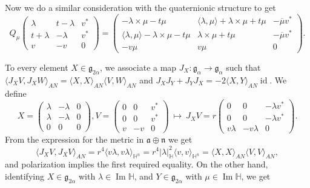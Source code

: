 \documentclass[12pt, a4paper]{amsart}
\newcommand{\id}{\operatorname{id}}
\newcommand{\g}{\mathfrak}
\renewcommand{\H}{\mathbb{H}}
\renewcommand{\Im}{\operatorname{Im}}
\theoremstyle{remark}
\begin{document}
Now we do a similar consideration with the quaternionic structure to get 
\[
Q_{\mu}\left(
\begin{array}{cc|c}
	\lambda & t-\lambda & v^{*} \\
	t+\lambda & -\lambda & v^{*} \\
	\hline
	v & -v & 0
\end{array}
\right)
=\left(
\begin{array}{cc|c}
-\lambda\times\mu-t\mu & \langle\lambda,\mu\rangle+\lambda\times\mu+t\mu & -\overline{\mu}v^{*} \\
\langle\lambda,\mu\rangle-\lambda\times\mu-t\mu & \lambda\times\mu+t\mu & -\overline{\mu}v^{*} \\
\hline
-v\mu & v\mu & 0
\end{array}
\right).
\]

To every element $X\in\g{g}_{2\alpha}$, we associate a map $J_{X}\colon\g{g}_{\alpha}\to\g{g}_{\alpha}$ such that 
$\langle J_X V,J_X W\rangle_{AN}=\langle X,X\rangle_{AN} \langle V,W\rangle_{AN}$ and 
$J_X J_Y+J_Y J_X=-2\langle X,Y\rangle_{AN}\id$.
We define
\begin{equation*}
X=\left(
\begin{array}{cc|c}
	\lambda & -\lambda & 0 \\
	\lambda & -\lambda & 0 \\
	\hline
	0 & 0 & 0
\end{array}
\right),
V=\left(
	\begin{array}{cc|c}
		0 & 0 & v^{*} \\
		0 & 0 & v^{*} \\
		\hline
		v & -v & 0
	\end{array}
\right)\ 
\mapsto\
J_{X}V=r\left(
	\begin{array}{cc|c}
		0 & 0 & -\lambda v^{*} \\
		0 & 0 & -\lambda v^{*} \\
		\hline
		v\lambda & -v\lambda & 0
	\end{array}
\right).
\end{equation*}
From the expression for the metric in $\g{a}\oplus\g{n}$ we get
\[
\langle J_X V,J_X V\rangle_{AN}
=r^4\langle v\lambda,v\lambda\rangle_{\H^n}
=r^4\lvert\lambda\rvert_{\H}^2\langle v, v\rangle_{\H^n}
=\langle X,X\rangle_{AN}\langle V, V\rangle_{AN},
\]	
and polarization implies the first required equality.
On the other hand, identifying $X\in\g{g}_{2\alpha}$ with $\lambda\in\Im\H$, and $Y\in\g{g}_{2\alpha}$ with $\mu\in\Im\H$, we get
\end{document}
